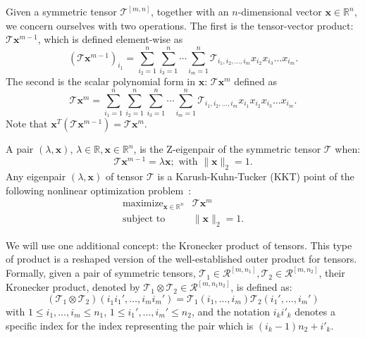 \documentclass[10pt, journal, compsoc, final]{IEEEtran}
\newcommand{\bs}[1]{\boldsymbol{#1}}
\newcommand{\Vector}[1]{\bs{#1}}
\newcommand{\Tensor}[1]{\mathbf{\mathcal{#1}}}
\newcommand{\R}{\mathbb{R}}
\begin{document}
Given a symmetric tensor $\Tensor{T}^{[m,n]}$, together with an $n$-dimensional vector
$\Vector{x}\in \R^{n}$, we concern ourselves with two operations. The first is the 
tensor-vector product: $\Tensor{T} \Vector{x}^{m-1}$, which is defined element-wise as
\begin{equation} \label{eq:ttv}
(\Tensor{T} \Vector{x}^{m-1})_{i_1} = \sum_{i_2=1}^n \sum_{i_3=1}^{n} \cdots \sum_{i_m=1}^{n} \Tensor{T}_{i_1, i_2,\ldots, i_m} x_{i_2}   x_{i_3} \ldots  x_{i_m}.
\end{equation}
The second is the scalar polynomial form in $\Vector{x}$: $\Tensor{T} \Vector{x}^{m}$ defined as
\begin{equation}
 \Tensor{T} \Vector{x}^{m} = \sum_{i_1=1}^n \sum_{i_2=1}^n \sum_{i_3=1}^{n} \cdots \sum_{i_m=1}^{n} \Tensor{T}_{i_1, i_2,\ldots, i_m} x_{i_1} x_{i_2}   x_{i_3} \ldots x_{i_m}.
 \label{eq:contract}
\end{equation}
Note that $\Vector{x}^T (\Tensor{T} \Vector{x}^{m-1}) = \Tensor{T} \Vector{x}^{m}$.







A pair $(\lambda, \Vector{x})$, $\lambda \in \R, \Vector{x} \in \R^n$, is the Z-eigenpair of
the symmetric tensor $\Tensor{T}$ when:
\begin{equation}
\Tensor{T}\Vector{x}^{m-1} = \lambda \Vector{x}; \text{ with } \| \Vector{x} \|_2 = 1.
\label{eq:eigen}
\end{equation}
Any eigenpair $(\lambda, \Vector{x})$ of tensor $\Tensor{T}$ is a Karush-Kuhn-Tucker (KKT)
point of the following nonlinear optimization problem~\cite{Lim}:
\begin{equation}
\begin{array}{ll}
 \displaystyle \mathop{\text{maximize}}_{\Vector{x} \in \R^n} & \Tensor{T} \Vector{x}^m \\
 \text{subject to} & \| \Vector{x} \|_2 = 1. 
\end{array}
\label{eq:optim}
\end{equation}

We will use one additional concept: the Kronecker product of tensors. This type of product is a reshaped
version of the well-established outer product for tensors. 
Formally, given a pair of symmetric tensors, $\Tensor{T}_1 \in \mathcal{R}^{[m, n_1]}, \Tensor{T}_2 \in
\mathcal{R}^{[m, n_2]}$, their Kronecker product, denoted by $\Tensor{T}_1 \otimes \Tensor{T}_2 \in
\mathcal{R}^{[m, n_1n_2]}$, is defined as:
\begin{equation}
(\Tensor{T}_1 \otimes \Tensor{T}_2)(i_1^{}i_1',  \ldots, i_m^{}i_m') = \Tensor{T}_1 (i_1, \ldots, i_m) \Tensor{T}_2 (i_1', \ldots, i_m')
\end{equation}
with $1 \leq i_1, \ldots, i_m \leq n_1$, $1 \leq i_1', \ldots, i_m' \leq n_2$, and the notation $i_ki'_k$ denotes a specific index for the index representing the pair which is $(i_k - 1)n_2 +i'_k$. 
\end{document}
